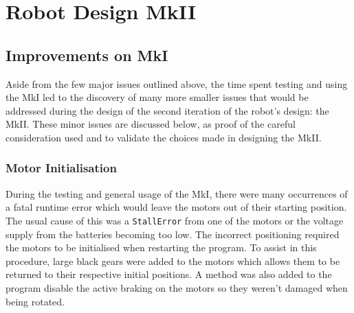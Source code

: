 \documentclass{report}
\begin{document}
    \section{Robot Design MkII}
	\subsection{Improvements on MkI}
	Aside from the few major issues outlined above, the time spent testing and using the MkI led to the discovery of many more smaller issues that would be addressed during the design of the second iteration of the robot's design: the MkII. These minor issues are discussed below, as proof of the careful consideration used and to validate the choices made in designing the MkII.
	
	\subsubsection{Motor Initialisation}
	
	During the testing and general usage of the MkI, there were many occurrences of a fatal runtime error which would leave the motors out of their starting position. The usual cause of this was a \lstinline|StallError| from one of the motors or the voltage supply from the batteries becoming too low. The incorrect positioning required the motors to be initialised when restarting the program. To assist in this procedure, large black gears were added to the motors which allows them to be returned to their respective initial positions. A method was also added to the program disable the active braking on the motors so they weren't damaged when being rotated.
	
\end{document}
